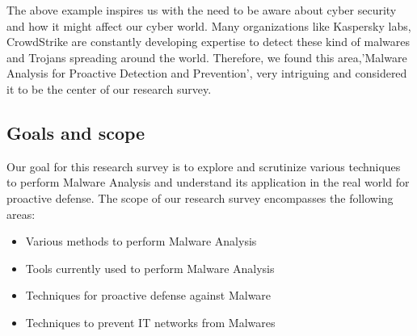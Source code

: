 \documentclass[11pt]{article}
\begin{document}
The above example inspires us with the need to be aware about cyber security and how it might affect our cyber world. Many organizations like Kaspersky labs, CrowdStrike are constantly developing expertise to detect these kind of malwares and Trojans spreading around the world. Therefore, we found this area,'Malware Analysis for Proactive Detection and Prevention', very intriguing and considered it to be the center of our research survey.
	\subsection{Goals and scope}
	Our goal for this research survey is to explore and scrutinize various techniques to perform Malware Analysis and understand its application in the real world for proactive defense.
	The scope of our research survey encompasses the following areas:
	\begin{itemize}[noitemsep]
		\item{Various methods to perform Malware Analysis}
		\item{Tools currently used to perform Malware Analysis} 
		\item{Techniques for proactive defense against Malware}
		\item{Techniques to prevent IT networks from Malwares}
	\end{itemize}
	
\end{document}
